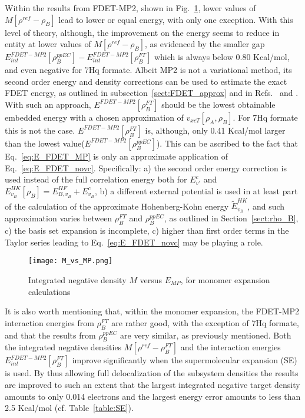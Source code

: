 \documentclass[journal=jctcce,manuscript=article, layout=twocolumn]{achemso}
\begin{document}
Within the results from FDET-MP2, shown in Fig.~\ref{fig:M_vs_MP}, lower values of $M[\rho^{ref} - \rho_B]$ lead to lower or equal energy, with only one exception.
With this level of theory, although, the improvement on the energy seems to reduce in entity at lower values of $M[\rho^{ref} - \rho_B]$, as evidenced by the smaller gap $E^{FDET-MP2}_{int}[\rho_B^{ppEC}] - E^{FDET-MP2}_{int}[\rho_B^{FT}]$ which is always below 0.80 Kcal/mol, and even negative for 7Hq formate.
Albeit MP2 is not a variational method, its second order energy and density corrections can be used to estimate the exact FDET energy, as outlined in subsection~\ref{sect:FDET_approx} and in Refs.~ and . With such an approach, $E^{FDET-MP2}[\rho_B^{FT}]$ should be the lowest obtainable embedded energy with a chosen approximation of $v_{xcT}[\rho_A,\rho_B]$. For 7Hq formate this is not the case. $E^{FDET-MP2}[\rho_B^{FT}]$ is, although, only 0.41 Kcal/mol larger than the lowest value($E^{FDET-MP2}[\rho_B^{ppEC}]$). This can be ascribed to the fact that Eq.~\ref{eq:E_FDET_MP} is only an approximate application of Eq.~\ref{eq:E_FDET_novc}. Specifically: a) the second order energy correction is used instead of the full correlation energy both for $E^c_{v'}$ and $E^{HK}_{v_B}[\rho_B] = E^{HF}_{B,v_B}+E^c_{v_B}$, b) a different external potential is used in at least part of the calculation of the approximate Hohenberg-Kohn energy $\tilde{E}^{HK}_{v_B}$, and such approximation varies between $\rho_B^{FT}$ and $\rho_B^{ppEC}$, as outlined in Section~\ref{sect:rho_B}, c) the basis set expansion is incomplete, c) higher than first order terms in the Taylor series leading to Eq.~\ref{eq:E_FDET_novc} may be playing a role.

\begin{figure}[H]
\centering
\texttt{[image: M\_vs\_MP.png]}
\caption{Integrated negative density $M$ versus $E_{MP}$, for monomer expansion calculations}
\label{fig:M_vs_MP}
\end{figure}

It is also worth mentioning that, within the monomer expansion, the FDET-MP2 interaction energies from $\rho_B^{FT}$ are rather good, with the exception of 7Hq formate, and that the results from  $\rho_B^{ppEC}$ are very similar, as previously mentioned. Both the integrated negative densities $M[\rho^{ref} - \rho^{FT}_{B}]$ and the interaction energies $E^{FDET-MP2}_{int}[\rho^{FT}_B]$ improve significantly when the supermolecular expansion (SE) is used. By thus allowing full delocalization of the subsystem densities the results are improved to such an extent that the largest integrated negative target density amounts to only 0.014 electrons and the largest energy error amounts to less than 2.5 Kcal/mol (cf. Table~\ref{table:SE}).
\end{document}
